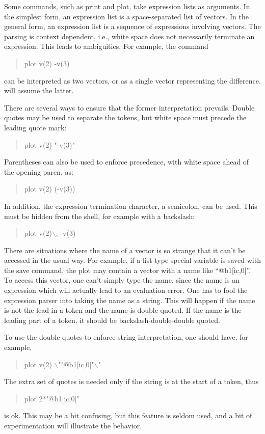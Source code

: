 Some commands, such as {\cb print} and {\cb plot}, take expression
lists as arguments.  In the simplest form, an expression list is a
space-separated list of vectors.  In the general form, an expression
list is a sequence of expressions involving vectors.  The parsing is
context dependent, i.e., white space does not necessarily terminate an
expression.  This leads to ambiguities.  For example, the command
\begin{quote}
{\vt plot v(2) -v(3)}
\end{quote}
can be interpreted as two vectors, or as a single vector representing
the difference.  {\WRspice} will assume the latter.

There are several ways to ensure that the former interpretation prevails.
Double quotes may be used to separate the tokens, but white space must
precede the leading quote mark:
\begin{quote}
\vt plot v(2) "-v(3)"
\end{quote}
Parentheses can also be used to enforce precedence, with white space
ahead of the opening paren, as:
\begin{quote}
\vt plot v(2) (-v(3))
\end{quote}
In addition, the expression termination character, a semicolon,
can be used.  This must be hidden from the shell, for example
with a backslash:
\begin{quote}
\vt plot v(2)$\backslash$; -v(3)
\end{quote}

There are situations where the name of a vector is so strange that it
can't be accessed in the usual way.  For example, if a list-type
special variable is saved with the {\cb save} command, the plot may
contain a vector with a name like ``{\vt @b1[ic,0]}''.  To access
this vector, one can't simply type the name, since the name is an
expression which will actually lead to an evaluation error.  One has
to fool the expression parser into taking the name as a string.  This
will happen if the name is not the lead in a token and the name is
double quoted.  If the name is the leading part of a token, it should
be backslash-double-double quoted.

To use the double quotes to enforce string interpretation, one should
have, for example,
\begin{quote}
{\vt plot v(2) $\backslash$""@b1[ic,0]"$\backslash$"}
\end{quote}
The extra set of quotes is needed only if the string is at the start
of a token, thus
\begin{quote}
{\vt plot 2*"@b1[ic,0]"}
\end{quote}
is ok.  This may be a bit confusing, but this feature is seldom
used, and a bit of experimentation will illustrate the behavior.

